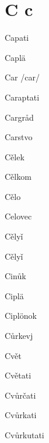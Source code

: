 \chapter{C c}

Capati 

Caplä 

Car /car/

Caraptati 

Cargråd 

Carstvo 

Cělek 

Cělkom 

Cělo 

Celovec 

Cělyǐ 

Cělyǐ 

Cinůk 

Ciplä 

Ciplönok 

Cůrkevj 

Cvět 

Cvětati 

Cvůrčati 

Cvůrkati 

Cvůrkutati 